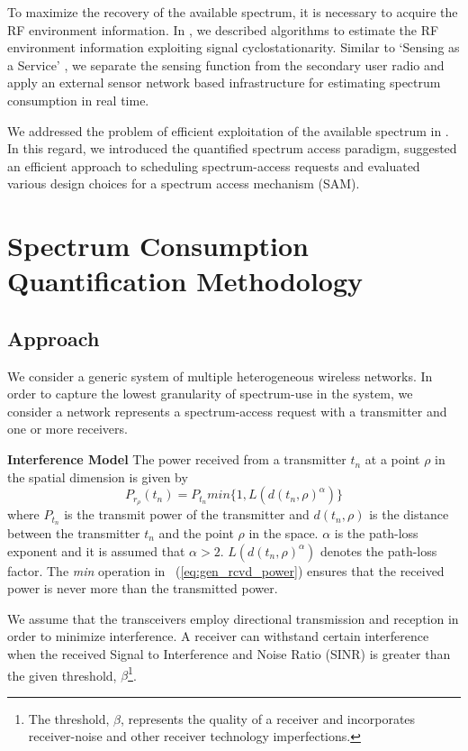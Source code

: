 \documentclass[journal,12pt,draftclsnofoot,onecolumn]{IEEEtran}
\begin{document}
To maximize the recovery of the available spectrum, it is necessary to acquire the RF environment information.  In \cite{sgn_icnc}, we described algorithms to estimate the RF environment information exploiting signal cyclostationarity. Similar to `Sensing as a Service' \cite{saas_weiss}, we separate the sensing function from the secondary user radio and apply an external sensor network based infrastructure for estimating spectrum consumption in real time\cite{oms4_sce}. 

We addressed the problem of efficient exploitation of the available spectrum in \cite{oms3_cf1}. In this regard, we introduced the quantified spectrum access paradigm, suggested an efficient approach to scheduling spectrum-access requests and evaluated various design choices for a spectrum access mechanism (SAM). 

\section{Spectrum Consumption Quantification Methodology}

\subsection{Approach}
We consider a generic system of multiple heterogeneous wireless networks. In order to capture the lowest granularity of spectrum-use in the system, we consider a network represents a spectrum-access request with a transmitter and one or more receivers. 

\noindent
\textbf{Interference Model}
The power received from a transmitter $t_n$ at a point $\rho$ in the spatial dimension is given by 
\begin{equation}
\label{eq:gen_rcvd_power}
P_{r_{\rho}}(t_n) = P_{t_n} min\Big\{1, L({d(t_n,\rho)}^{\alpha})\Big\}
\end{equation}
where $P_{t_n}$ is the transmit power of the transmitter and $d(t_n,\rho)$ is the distance between the transmitter $t_n$ and the point $\rho$ in the space. ${\alpha}$ is the path-loss exponent and it is assumed that $\alpha > 2$.  $L({d(t_n,\rho)}^{\alpha})$ denotes the path-loss factor. The \textit{min} operation in ~(\ref{eq:gen_rcvd_power}) ensures that the received power is never more than the transmitted power.

We assume that the transceivers employ directional transmission and reception in order to minimize interference. A receiver can withstand certain interference when the received Signal to Interference and Noise Ratio (SINR) is greater than the given threshold, $\beta$\footnote{The threshold, $\beta$, represents the quality of a receiver and incorporates receiver-noise and other receiver technology imperfections.}. 
\end{document}
